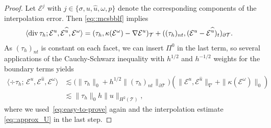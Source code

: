 \begin{proof}
  Let
  $\mathcal{E}^j$ with $j \in \{\sigma, u, \hat u, \omega, p\}$ denote the
  corresponding components of the interpolation error.
  Then \eqref{eq::mcsbblf} implies 
  \begin{align*}
    \langle\operatorname{div}\tau_h; \mathcal{E}^u, \mathcal{E}^{\widehat{u}}, \mathcal{E}^{\omega}\rangle
    & = (\tau_h, \kappa(\mathcal{E}^{\omega}) - \nabla \mathcal{E}^u)_{\mathcal{T}}
      + ((\tau_h)_{nt}, (\mathcal{E}^u - \mathcal{E}^{\widehat{u}})_t)_{\partial\mathcal{T}}.
  \end{align*}
  As $(\tau_h)_{nt}$ is constant on each facet,
  we can insert $\Pi^0$ in the last term, so several applications of the
  Cauchy-Schwarz inequality with  $h^{1/2}$ and $h^{-1/2}$ weights
  for the boundary terms yields
  \begin{align} \nonumber 
    \langle\div\tau_h;\, \mathcal{E}^u, \mathcal{E}^{\hat{u}}, \mathcal{E}^{\omega}\rangle
      & \lesssim \big( \|\tau_h\|_0
        +  h^{1/2}\|(\tau_h)_{nt}\|_{\partial \mathcal{T}}\big)(\|\mathcal{E}^u,\mathcal{E}^{\hat{u}}\|_{\nabla} + \|\kappa(\mathcal{E}^{\omega})\|_0)\\     \label{eq:Euuw}
    & \lesssim  \|\tau_h\|_0 h \|u\|_{H^2(\mathcal{T})},
    \end{align}
  where we used~\eqref{eq:easy-to-prove} again %
  and the
  interpolation estimate \eqref{eq::approx_U} in the last step.


\end{proof}
